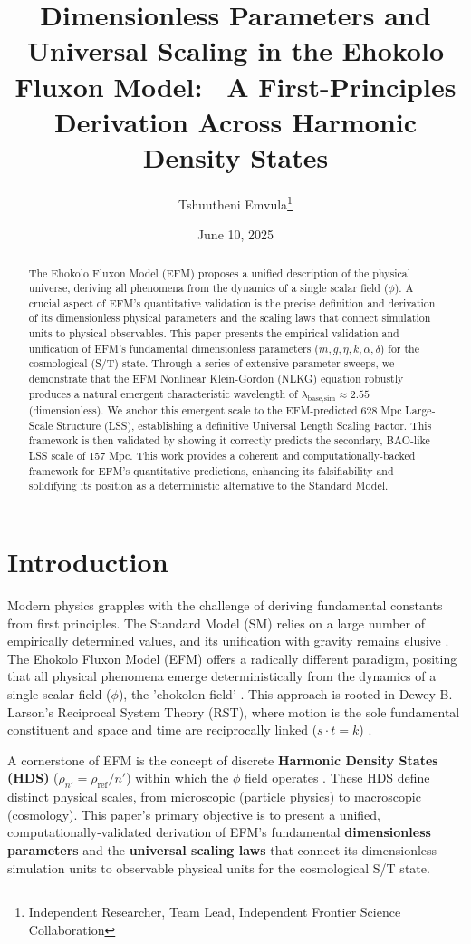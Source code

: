 \documentclass[11pt]{article}
\title{Dimensionless Parameters and Universal Scaling in the Ehokolo Fluxon Model: \ A First-Principles Derivation Across Harmonic Density States}
\author{Tshuutheni Emvula\thanks{Independent Researcher, Team Lead, Independent Frontier Science Collaboration}}
\date{June 10, 2025}
\begin{document}
\maketitle

\begin{abstract}
The Ehokolo Fluxon Model (EFM) proposes a unified description of the physical universe, deriving all phenomena from the dynamics of a single scalar field ($\phi$). A crucial aspect of EFM's quantitative validation is the precise definition and derivation of its dimensionless physical parameters and the scaling laws that connect simulation units to physical observables. This paper presents the empirical validation and unification of EFM's fundamental dimensionless parameters ($m, g, \eta, k, \alpha, \delta$) for the cosmological (S/T) state. Through a series of extensive parameter sweeps, we demonstrate that the EFM Nonlinear Klein-Gordon (NLKG) equation robustly produces a natural emergent characteristic wavelength of $\lambda_{\text{base,sim}} \approx 2.55$ (dimensionless). We anchor this emergent scale to the EFM-predicted 628 Mpc Large-Scale Structure (LSS), establishing a definitive Universal Length Scaling Factor. This framework is then validated by showing it correctly predicts the secondary, BAO-like LSS scale of 157 Mpc. This work provides a coherent and computationally-backed framework for EFM's quantitative predictions, enhancing its falsifiability and solidifying its position as a deterministic alternative to the Standard Model.
\end{abstract}

\section{Introduction}
Modern physics grapples with the challenge of deriving fundamental constants from first principles. The Standard Model (SM) relies on a large number of empirically determined values, and its unification with gravity remains elusive \citep{SMReviewPlaceholder}. The Ehokolo Fluxon Model (EFM) offers a radically different paradigm, positing that all physical phenomena emerge deterministically from the dynamics of a single scalar field ($\phi$), the 'ehokolon field' \citep{emvula2025compendium_intro,emvula2025efm_foundations}. This approach is rooted in Dewey B. Larson's Reciprocal System Theory (RST), where motion is the sole fundamental constituent and space and time are reciprocally linked ($s \cdot t = k$) \citep{larson1959}.

A cornerstone of EFM is the concept of discrete \textbf{Harmonic Density States (HDS)} ($\rho_{n'} = \rho_{\text{ref}}/n'$) within which the $\phi$ field operates \citep{emvula2025efm_hds_validated}. These HDS define distinct physical scales, from microscopic (particle physics) to macroscopic (cosmology). This paper’s primary objective is to present a unified, computationally-validated derivation of EFM’s fundamental \textbf{dimensionless parameters} and the \textbf{universal scaling laws} that connect its dimensionless simulation units to observable physical units for the cosmological S/T state.
\end{document}
